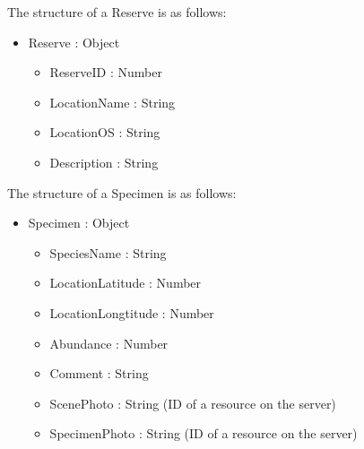         The structure of a Reserve is as follows:
        \begin{itemize}
        	\item Reserve : Object
        	\begin{itemize}
                \item ReserveID : Number
        		\item LocationName : String 
        		\item LocationOS : String
                \item Description : String
        	\end{itemize}
        \end{itemize}

        The structure of a Specimen is as follows:
        \begin{itemize}
            \item Specimen : Object
            \begin{itemize}
                \item SpeciesName : String
                \item LocationLatitude : Number
                \item LocationLongtitude : Number
                \item Abundance : Number
                \item Comment : String
                \item ScenePhoto : String (ID of a resource on the server)
                \item SpecimenPhoto : String (ID of a resource on the server)
            \end{itemize}
        \end{itemize}
        
